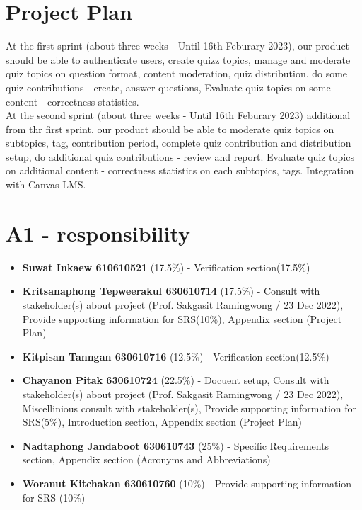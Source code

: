 \documentclass[ 10pt]{report}
\begin{document}
        \section{Project Plan}
        At the first sprint (about three weeks - Until 16th Feburary 2023), our product should be able to authenticate users, create quizz topics, manage and moderate quiz topics on question format, content moderation, quiz distribution. do some quiz contributions - create, answer questions,  Evaluate quiz topics on some content - correctness statistics. \\
        \indent At the second sprint (about three weeks - Until 16th Feburary 2023) additional from thr first sprint, our product should be able to moderate quiz topics on subtopics, tag, contribution period, complete quiz contribution and distribution setup, do additional quiz contributions - review and report.  Evaluate quiz topics on additional content - correctness statistics on each subtopics, tags. Integration with Canvas LMS. \\
        \pagebreak

        \section{A1 - responsibility}
        \begin{itemize}
            \item \textbf{Suwat Inkaew 610610521} (17.5\%) - Verification section(17.5\%)
            \item \textbf{Kritsanaphong Tepweerakul 630610714} (17.5\%) - Consult with stakeholder(s) about project (Prof. Sakgasit Ramingwong / 23 Dec 2022), Provide supporting information for SRS(10\%), Appendix section (Project Plan)
            \item \textbf{Kitpisan Tanngan 630610716} (12.5\%) - Verification section(12.5\%)
            \item \textbf{Chayanon Pitak 630610724} (22.5\%) - Docuent setup, Consult with stakeholder(s) about project (Prof. Sakgasit Ramingwong / 23 Dec 2022), Miscellinious consult with stakeholder(s), Provide supporting information for SRS(5\%), Introduction section, Appendix section (Project Plan)
            \item \textbf{Nadtaphong Jandaboot 630610743} (25\%) - Specific Requirements section, Appendix section (Acronyms and Abbreviations)
            \item \textbf{Woranut Kitchakan 630610760} (10\%) - Provide supporting information for SRS (10\%)
        \end{itemize}
\end{document}
